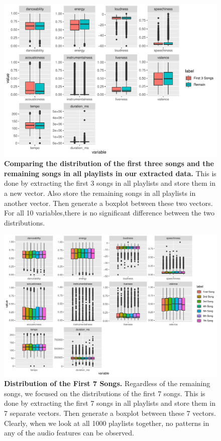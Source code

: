 \documentclass[12pt]{article}
\theoremstyle{plain}
\theoremstyle{definition}
\theoremstyle{remark}
\begin{document}
\begin{figure}[htp]
    \centering
    \includegraphics[width=\textwidth]{Images/1st3.pdf}
    \caption{\textbf{Comparing the distribution of the first three songs and the remaining songs in all playlists in our extracted data.} This is done by extracting the first 3 songs in all playlists and store them in a new vector. Also store the remaining songs in all playlists in another vector. Then generate a boxplot between these two vectors. For all 10 variables,there is no significant difference between the two distributions.}
    \label{fig:1st3}
\end{figure}

\newpage
\begin{figure}[h]
    \centering
    \includegraphics[width=\textwidth]{Images/1st7.pdf}
    \caption{\textbf{Distribution of the First 7 Songs.} Regardless of the remaining songs, we focused on the distributions of the first 7 songs. This is done by extracting the first 7 songs in all playlists and store them in 7 separate vectors. Then generate a boxplot between these 7 vectors. Clearly, when we look at all 1000 playlists together, no patterns in any of the audio features can be observed.}
    \label{fig:1st7}
\end{figure}
\end{document}
